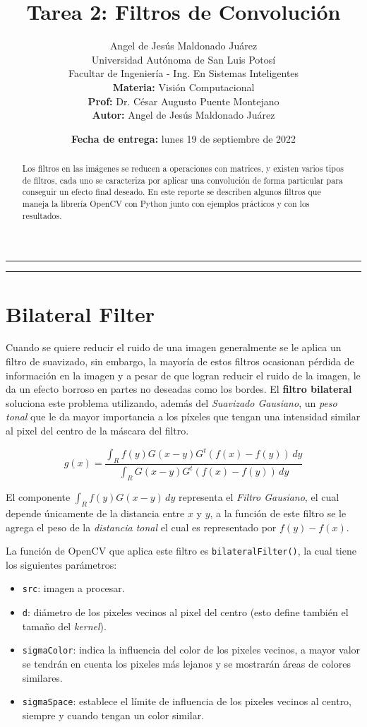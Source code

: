 \documentclass[a4paper, 12pt]{article}
\title{\vspace{-3cm}Tarea 2: Filtros de Convolución}
\author{
    Angel de Jesús Maldonado Juárez\\
    Universidad Autónoma de San Luis Potosí\\
    Facultar de Ingeniería - Ing. En Sistemas Inteligentes\\
    \textbf{Materia:} Visión Computacional\\
    \textbf{Prof:} Dr. César Augusto Puente Montejano\\
    \textbf{Autor:} Angel de Jesús Maldonado Juárez
}
\date{\textbf{Fecha de entrega:} lunes 19 de septiembre de 2022}
\begin{document}
\maketitle

\begin{center}
    \rule{\textwidth}{0.5pt}
    \begin{abstract}
        \noindent Los filtros en las imágenes se reducen a operaciones con matrices, y existen varios tipos de filtros, cada uno se caracteriza por aplicar una convolución de forma particular para conseguir un efecto final deseado. En este reporte se describen algunos filtros que maneja la librería OpenCV con Python junto con ejemplos prácticos y con los resultados.
    \end{abstract}
    \rule{\textwidth}{0.5pt}
\end{center}

\section{Bilateral Filter}
Cuando se quiere reducir el ruido de una imagen generalmente se le aplica un filtro de suavizado, sin embargo, la mayoría de estos filtros ocasionan pérdida de información en la imagen y a pesar de que logran reducir el ruido de la imagen, le da un efecto borroso en partes no deseadas como los bordes. El \textbf{filtro bilateral} soluciona este problema utilizando, además del \emph{Suavizado Gausiano}, un \emph{peso tonal} que le da mayor importancia a los píxeles que tengan una intensidad similar al pixel del centro de la máscara del filtro.

\begin{equation}
    g(x) = \frac
    {
        \int_{R} f(y) G(x - y) G^t(f(x) - f(y))\,dy
    }
    {
        \int_{R} G(x - y) G^t(f(x) - f(y))\,dy
    }
\end{equation}

El componente $\int_{R} f(y) G(x - y)\,dy$ representa el \emph{Filtro Gausiano}, el cual depende únicamente de la distancia entre $x$ y $y$, a la función de este filtro se le agrega el peso de la \emph{distancia tonal} el cual es representado por $f(y) - f(x)$.

La función de OpenCV que aplica este filtro es \lstinline{bilateralFilter()}, la cual tiene los siguientes parámetros:

\begin{itemize}
    \item \lstinline{src}: imagen a procesar.
    \item \lstinline{d}: diámetro de los pixeles vecinos al pixel del centro (esto define también el tamaño del \emph{kernel}).
    \item \lstinline{sigmaColor}: indica la influencia del color de los pixeles vecinos, a mayor valor se tendrán en cuenta los pixeles más lejanos y se mostrarán áreas de colores similares.
    \item \lstinline{sigmaSpace}: establece el límite de influencia de los pixeles vecinos al centro, siempre y cuando tengan un color similar.
\end{itemize}
\end{document}
